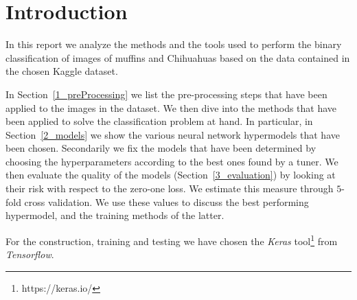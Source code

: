 \setcounter{section}{-1}
\section{Introduction}\label{0:introduction}
In this report we analyze the methods and the tools used to perform the binary classification of images of muffins and Chihuahuas based on the data contained in the chosen Kaggle dataset\cite{dataset}. 

In Section~\ref{1_preProcessing} we list the pre-processing steps that have been applied to the images in the dataset. We then dive into the methods that have been applied to solve the classification problem at hand. In particular, in Section~\ref{2_models} we show the various neural network hypermodels that have been chosen. Secondarily we fix the models that have been determined by choosing the hyperparameters according to the best ones found by a tuner. We then evaluate the quality of the models (Section~\ref{3_evaluation}) by looking at their risk with respect to the zero-one loss. We estimate this measure through $5$-fold cross validation. We use these values to discuss the best performing hypermodel, and the training methods of the latter.

For the construction, training and testing we have chosen the \textit{Keras} tool\footnote{https://keras.io/} from \textit{Tensorflow}.